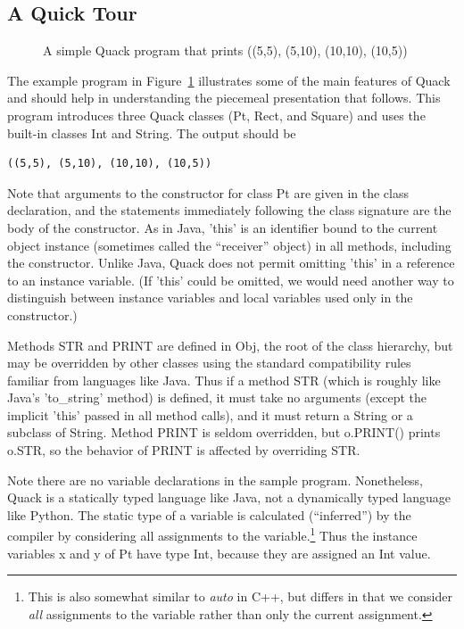 \documentclass[11pt]{article}
\begin{document}
\subsection{A Quick Tour}

\begin{figure}

\caption[A simple Quack program]{A simple Quack program 
  that prints 
  ((5,5), (5,10), (10,10), (10,5))} 
\label{fig-square}
\end{figure}

The example program in Figure~\ref{fig-square} illustrates some of the
main features of Quack and should help in understanding the piecemeal
presentation that follows.   This program introduces three Quack
classes (Pt, Rect, and Square) and uses the built-in classes Int and
String.   The output should be 

\begin{verbatim}
((5,5), (5,10), (10,10), (10,5))
\end{verbatim}

Note  that arguments to the constructor for class Pt are given in
the class declaration, and the statements immediately following the
class signature are the body of the constructor.  As in Java, 'this'
is an identifier bound to the current object instance (sometimes
called the ``receiver'' object) in all methods, including the
constructor.  Unlike Java, Quack does not permit omitting 'this' in a
reference to an instance variable.   (If 'this' could be omitted, 
we would need another way to distinguish between instance 
variables and local variables used
only in the constructor.) 

Methods STR and PRINT are defined in Obj, the root of the class
hierarchy, but may be overridden by other classes using the standard
compatibility rules familiar from languages like Java.   Thus if a
method STR (which is roughly like Java's 'to\_string' method) is
defined, it must take no arguments (except the implicit 'this' passed
in all method calls), and it must return a String or a subclass of
String.  Method PRINT is seldom overridden, but o.PRINT() prints 
o.STR, so the behavior of PRINT is affected by overriding STR. 

Note there are no variable declarations in the sample program.
Nonetheless, Quack is a statically typed language like Java, not a
dynamically typed language like Python.  The static type of a variable
is calculated (``inferred'') by the compiler by considering all
assignments to the variable.\footnote{This is also somewhat similar to
  \emph{auto} in C++, but differs in that we consider 
  \emph{all} assignments to the variable rather than only 
  the current assignment.} Thus the instance variables x and y of
Pt have type Int, because they are assigned an Int value.  
\end{document}
